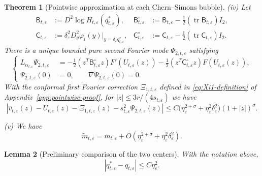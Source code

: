 \documentclass[10pt,a4paper]{amsart}
\numberwithin{equation}{section}
\newtheorem{theorem}{Theorem}[section]
\newtheorem{lemma}[theorem]{Lemma}
\theoremstyle{definition}
\theoremstyle{remark}
\newcommand{\eps}{\varepsilon}
\newcommand{\etae}{\eta_{\eps}}
\newcommand{\de}{\delta_{\eps}}
\newcommand{\tr}{\operatorname{tr}}
\begin{document}
\begin{theorem}[Pointwise approximation at each Chern--Simons bubble]
\smallskip
\noindent\textup{(iv)}
Let
\begin{equation}\label{eq:B-tracefree}
\begin{aligned}
 \mathsf B_{t,\eps}
   &:=D^2\log H_{t,\eps}(q_{t,\eps}^*),
 &\mathsf B_{t,\eps}^{\circ}
   &:=\mathsf B_{t,\eps}-\tfrac12(\tr\mathsf B_{t,\eps})I_2,\\
 \mathsf C_{t,\eps}
   &:=\de^2D^2_y\varphi_i(y)\Big|_{y=\de q^*_{t,\eps}},
 &\mathsf C_{t,\eps}^{\circ}
   &:=\mathsf C_{t,\eps}-\tfrac12(\tr\mathsf C_{t,\eps})I_2.
\end{aligned}
\end{equation}
There is a unique bounded pure second Fourier mode $\Psi_{2,t,\eps}$
satisfying
\begin{equation}\label{eq:Psi2-equation}
\left\{
\begin{aligned}
 L_{\alpha_{t,\eps}}\Psi_{2,t,\eps}
   &=-\tfrac12(z^T\mathsf B_{t,\eps}^{\circ}z)F'(U_{t,\eps}(z))
     -\tfrac12(z^T\mathsf C_{t,\eps}^{\circ}z)F(U_{t,\eps}(z)),\\
 \Psi_{2,t,\eps}(0)&=0,\qquad \nabla\Psi_{2,t,\eps}(0)=0.
\end{aligned}
\right.
\end{equation}
With the conformal first Fourier correction $\Xi_{1,t,\eps}$
defined in \eqref{eq:Xi1-definition} of
Appendix~\ref{app:pointwise-proof},
for $|z|\le 3r/(4s_{t,\eps})$ we have
\begin{equation}\label{eq:second-mode-refinement}
 \left|\widehat v_{t,\eps}(z)-U_{t,\eps}(z)
       -\Xi_{1,t,\eps}(z)-s_{t,\eps}^2\Psi_{2,t,\eps}(z)\right|
 \le C\bigl(\etae^{2+\sigma}+\etae^2\de^2\bigr)(1+|z|)^\sigma.
\end{equation}

\smallskip
\noindent\textup{(v)} We have
\begin{equation}
  \widetilde m_{t,\eps}=m_{t,\eps}
  +O(\etae^{2+\sigma}+\etae^2\de^2).
  \label{eq:local-mass-refined}
\end{equation}
\end{theorem}

\setcounter{section}{8}
\setcounter{equation}{7}
\setcounter{theorem}{0}
\begin{lemma}[Preliminary comparison of the two centers]
\label{lem:preliminary-center}
With the notation above,
\begin{equation}
  |q_{t,\eps}^*-q_{t,\eps}|\le C\etae^2.
  \label{eq:preliminary-center}
\end{equation}
\end{lemma}
\end{document}
